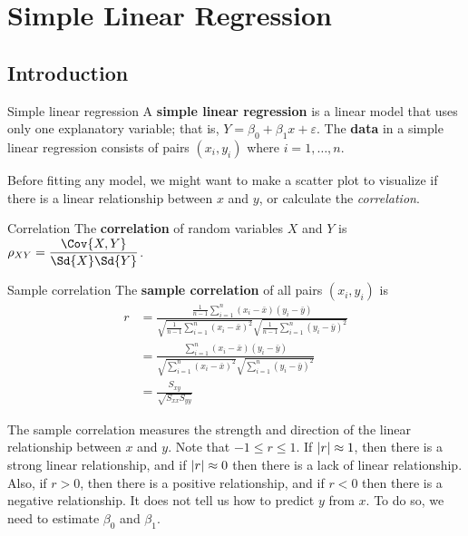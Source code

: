 \chapter{Simple Linear Regression}
\section{Introduction}
\begin{Definition}{Simple linear regression}{}
    A \textbf{simple linear regression}
    is a linear model that uses only one
    explanatory variable; that is,
    $ Y=\beta_0+\beta_1x+\varepsilon $.
    The \textbf{data}
    in a simple linear regression consists of pairs $ (x_i,y_i) $
    where $ i=1,\ldots,n $.
\end{Definition}
\begin{Remark}{}{}
    Before fitting any model, we might want
    to make a scatter plot to visualize if there
    is a linear relationship between $ x $ and $ y $,
    or calculate the \emph{correlation}.
\end{Remark}
\begin{Definition}{Correlation}{}
    The \textbf{correlation} of
    random variables $ X $ and $ Y $ is
    $ \rho_{XY}=\dfrac{\Cov{X,Y}}{\Sd{X}\Sd{Y}} $.
\end{Definition}
\begin{Definition}{Sample correlation}{}
    The \textbf{sample correlation} of
    all pairs $ (x_i,y_i) $ is
    \begin{align*}
        r
         & =\frac{\frac{1}{n-1} \sum_{i=1}^{n}(x_i-\bar{x})(y_i-\bar{y})}
        {\sqrt{\frac{1}{n-1}\sum_{i=1}^{n} (x_i-\bar{x})^2}
        \sqrt{\frac{1}{n-1}\sum_{i=1}^{n}(y_i-\bar{y})^2}}                \\
         & =\frac{\sum_{i=1}^{n} (x_i-\bar{x})(y_i-\bar{y})}{
            \sqrt{\sum_{i=1}^{n} (x_i-\bar{x})^2}
            \sqrt{\sum_{i=1}^{n} (y_i-\bar{y})^2}
        }                                                                 \\
         & =\frac{S_{xy}}{\sqrt{S_{xx}S_{yy}}}
    \end{align*}
\end{Definition}
\begin{Remark}{}{}
    The sample correlation measures the strength and direction of
    the linear relationship between $ x $ and $ y $. Note
    that $ -1\leqslant r\leqslant 1 $.
    If $ \lvert r\rvert\approx 1 $, then
    there is a strong linear relationship, and if
    $ \lvert r\rvert\approx 0 $
    then there is a lack of linear relationship. Also, if $ r>0 $,
    then there is a positive relationship, and if $ r<0 $
    then there is a negative relationship.
    It does not tell us how to predict $ y $ from $ x $. To do so,
    we need to estimate $ \beta_0 $ and $ \beta_1 $.
\end{Remark}

